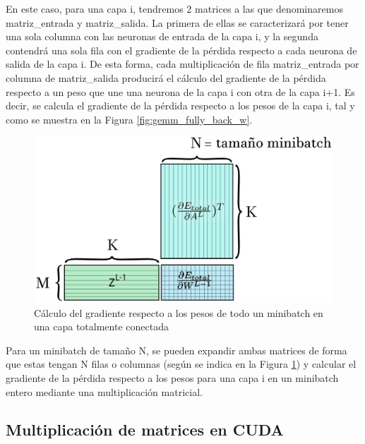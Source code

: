 En este caso, para una capa i, tendremos 2 matrices a las que denominaremos matriz\_entrada y matriz\_salida. La primera de ellas se caracterizará por tener una sola columna con las neuronas de entrada de la capa i, y la segunda contendrá una sola fila con el gradiente de la pérdida respecto a cada neurona de salida de la capa i. De esta forma, cada multiplicación de fila matriz\_entrada por columna de matriz\_salida producirá el cálculo del gradiente de la pérdida respecto a un peso que une una neurona de la capa i con otra de la capa i+1. Es decir, se calcula el gradiente de la pérdida respecto a los pesos de la capa i, tal y como se muestra en la Figura \ref{fig:gemm_fully_back_w}.

\begin{figure}[H]
	\centering
	\includegraphics[scale=0.25]{imagenes/gemm_fully_back_w_minibatch.jpg}  
	\caption{Cálculo del gradiente respecto a los pesos de todo un minibatch en una capa totalmente conectada}
	\label{fig:gemm_fully_back_w_minibatch}
\end{figure}

Para un minibatch de tamaño N, se pueden expandir ambas matrices de forma que estas tengan N filas o columnas (según se indica en la Figura \ref{fig:gemm_fully_back_w_minibatch}) y calcular el gradiente de la pérdida respecto a los pesos para una capa i en un minibatch entero mediante una multiplicación matricial.

\subsection{Multiplicación de matrices en CUDA}

